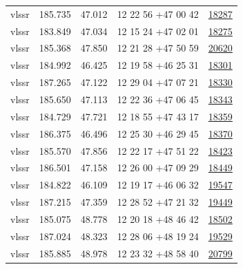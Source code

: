 \documentclass{article}
\begin{document}
\begin{longtable}{c|c|c|c|c}
vlssr & 185.735 & 47.012 & 12 22 56 +47 00 42 &  \href{http://banana.transientskp.org/r4/vlo_KmeulenTrap4P23/runningcatalog/18287}{18287} \\
vlssr & 183.849 & 47.034 & 12 15 24 +47 02 01 &  \href{http://banana.transientskp.org/r4/vlo_KmeulenTrap4P23/runningcatalog/18275}{18275} \\
vlssr & 185.368 & 47.850 & 12 21 28 +47 50 59 &  \href{http://banana.transientskp.org/r4/vlo_KmeulenTrap4P23/runningcatalog/20620}{20620} \\
vlssr & 184.992 & 46.425 & 12 19 58 +46 25 31 &  \href{http://banana.transientskp.org/r4/vlo_KmeulenTrap4P23/runningcatalog/18301}{18301} \\
vlssr & 187.265 & 47.122 & 12 29 04 +47 07 21 &  \href{http://banana.transientskp.org/r4/vlo_KmeulenTrap4P23/runningcatalog/18330}{18330} \\
vlssr & 185.650 & 47.113 & 12 22 36 +47 06 45 &  \href{http://banana.transientskp.org/r4/vlo_KmeulenTrap4P23/runningcatalog/18343}{18343} \\
vlssr & 184.729 & 47.721 & 12 18 55 +47 43 17 &  \href{http://banana.transientskp.org/r4/vlo_KmeulenTrap4P23/runningcatalog/18359}{18359} \\
vlssr & 186.375 & 46.496 & 12 25 30 +46 29 45 &  \href{http://banana.transientskp.org/r4/vlo_KmeulenTrap4P23/runningcatalog/18370}{18370} \\
vlssr & 185.570 & 47.856 & 12 22 17 +47 51 22 &  \href{http://banana.transientskp.org/r4/vlo_KmeulenTrap4P23/runningcatalog/18423}{18423} \\
vlssr & 186.501 & 47.158 & 12 26 00 +47 09 29 &  \href{http://banana.transientskp.org/r4/vlo_KmeulenTrap4P23/runningcatalog/18449}{18449} \\
vlssr & 184.822 & 46.109 & 12 19 17 +46 06 32 &  \href{http://banana.transientskp.org/r4/vlo_KmeulenTrap4P23/runningcatalog/19547}{19547} \\
vlssr & 187.215 & 47.359 & 12 28 52 +47 21 32 &  \href{http://banana.transientskp.org/r4/vlo_KmeulenTrap4P23/runningcatalog/19449}{19449} \\
vlssr & 185.075 & 48.778 & 12 20 18 +48 46 42 &  \href{http://banana.transientskp.org/r4/vlo_KmeulenTrap4P23/runningcatalog/18502}{18502} \\
vlssr & 187.024 & 48.323 & 12 28 06 +48 19 24 &  \href{http://banana.transientskp.org/r4/vlo_KmeulenTrap4P23/runningcatalog/19529}{19529} \\
vlssr & 185.885 & 48.978 & 12 23 32 +48 58 40 &  \href{http://banana.transientskp.org/r4/vlo_KmeulenTrap4P23/runningcatalog/20799}{20799} \\

\end{longtable}
\end{document}
